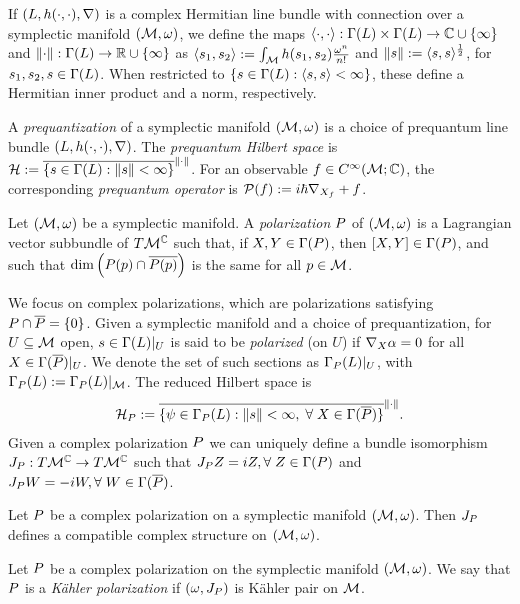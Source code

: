 \documentclass[notas.tex]{subfiles} 				%
\begin{document}
If $(L, h(\cdot,\cdot), \nabla)$ is a complex Hermitian line bundle with connection over a symplectic manifold $(\mathcal{M}, \omega)$, we define the maps $\langle \cdot,\cdot \rangle: \Gamma(L) \times \Gamma(L) \to \mathbb{C} \cup \{\infty\}$ and $\left\lVert\cdot\right\rVert: \Gamma(L) \to \mathbb{R} \cup \{\infty\}$ as $\langle s_1,s_2 \rangle := \int_{\mathcal{M}} h(s_1,s_2)\frac{\omega^n}{n!}$ and $\left\lVert s\right\rVert := \langle s,s \rangle^{\frac{1}{2}}$,
for $s_1, s_2, s \in \Gamma(L)$. When restricted to $\{s \in \Gamma(L): \langle s,s \rangle < \infty \}$, these define a Hermitian inner product and a norm, respectively.
\begin{defn}
	A \emph{prequantization} of a symplectic manifold $(\mathcal{M}, \omega)$ is a choice of prequantum line bundle $(L, h(\cdot,\cdot), \nabla)$. The \emph{prequantum Hilbert space} is $\mathcal{H} := \overline{\left \{s \in \Gamma(L): \left\lVert s\right\rVert < \infty \right \}}^{\left\lVert\cdot\right\rVert}$. For an observable $f \in C^\infty(\mathcal{M};\mathbb{C})$, the corresponding \emph{prequantum operator} is $\mathcal{P}(f) := i \hbar \nabla_{X_f} + f$.
\end{defn}
\begin{defn} \label{def_polarization}
Let $(\mathcal{M}, \omega)$ be a symplectic manifold. A \emph{polarization} $P$ of $(\mathcal{M},\omega)$ is a Lagrangian vector subbundle of $T\mathcal{M}^{\mathbb{C}}$ such that, if $X, Y \in \Gamma(P)$, then $[X,Y] \in \Gamma(P)$, and such that $\dim \left( P(p) \cap \overline{P(p)} \right)$ is the same for all $p \in \mathcal{M}$.
\end{defn}
We focus on complex polarizations, which are polarizations satisfying $P \cap \overline{P} = \{0\}$. Given a symplectic manifold and a choice of prequantization, for $U \subseteq \mathcal{M}$ open, $s \in \Gamma(L)|_U$ is said to be \emph{polarized} (on $U$) if $\nabla_{X} \alpha = 0$ for all $X \in \Gamma(\overline {P})|_U$. We denote the set of such sections as $\Gamma_P(L)|_U$, with $\Gamma_P(L):= \Gamma_P(L)|_{\mathcal{M}}$. The reduced Hilbert space is
\begin{align} \label{eq_reduced_hilb}
	\hilb_\pol := \close{\{\psi \in \sect_\pol(\lbund): \norm{s} < \infty, \; \forall X \in \Gamma(\overline{\pol})\}}^{\norm{\cdot}}.
\end{align}
Given a complex polarization $P$ we can uniquely define a bundle isomorphism $J_{P}: T\mathcal{M}^{\mathbb{C}} \to T\mathcal{M}^{\mathbb{C}}$ such that $J_\pol Z = i Z, \forall Z \in \sect(P)$ and $	J_\pol W = - i W,  \forall W \in \sect(\overline P)$.
\begin{prop} \label{prop_cstruct_from_pol}
	Let $P$ be a complex polarization on a symplectic manifold $(\mathcal{M}, \omega)$. Then $J_P$ defines a compatible complex structure on $(\mathcal{M}, \omega)$.
\end{prop}
\begin{defn} \label{def_kahler_polarization}
	Let $P$ be a complex polarization on the symplectic manifold $(\mathcal{M}, \omega)$. We say that $P$ is a \emph{Kähler polarization} if $(\omega, J_P)$ is Kähler pair on $\mathcal{M}$.
\end{defn}
\end{document}
